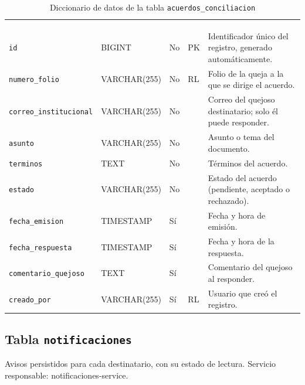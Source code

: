 \footnotesize
\renewcommand{\arraystretch}{1.15}
\setlength{\tabcolsep}{4pt}
\begin{longtable}{|L{3.9cm}|L{2.4cm}|L{0.9cm}|L{1.2cm}|L{6.6cm}|}
	\hiderowcolors\caption{Diccionario de datos de la tabla \texttt{acuerdos\_conciliacion}}
	\label{tab:dic_acuerdos_conciliacion} \\ \showrowcolors
	\hline
	 &  &  &  &  \\
	\hline
	\endfirsthead
	\hline
	 &  &  &  &  \\
	\hline
	\endhead
		\texttt{id} & BIGINT & No & PK & Identificador único del registro, generado automáticamente. \\ \hline
		\texttt{numero\_\allowbreak{}folio} & VARCHAR(255) & No & RL & Folio de la queja a la que se dirige el acuerdo. \\ \hline
		\texttt{correo\_\allowbreak{}institucional} & VARCHAR(255) & No &  & Correo del quejoso destinatario; solo él puede responder. \\ \hline
		\texttt{asunto} & VARCHAR(255) & No &  & Asunto o tema del documento. \\ \hline
		\texttt{terminos} & TEXT & No &  & Términos del acuerdo. \\ \hline
		\texttt{estado} & VARCHAR(255) & No &  & Estado del acuerdo (pendiente, aceptado o rechazado). \\ \hline
		\texttt{fecha\_\allowbreak{}emision} & TIMESTAMP & Sí &  & Fecha y hora de emisión. \\ \hline
		\texttt{fecha\_\allowbreak{}respuesta} & TIMESTAMP & Sí &  & Fecha y hora de la respuesta. \\ \hline
		\texttt{comentario\_\allowbreak{}quejoso} & TEXT & Sí &  & Comentario del quejoso al responder. \\ \hline
		\texttt{creado\_\allowbreak{}por} & VARCHAR(255) & Sí & RL & Usuario que creó el registro. \\ \hline
\end{longtable}
\normalsize
\setlength{\tabcolsep}{6pt}
\renewcommand{\arraystretch}{1}

\subsection{Tabla \texttt{notificaciones}}
Avisos persistidos para cada destinatario, con su estado de lectura. Servicio responsable: notificaciones-service.


